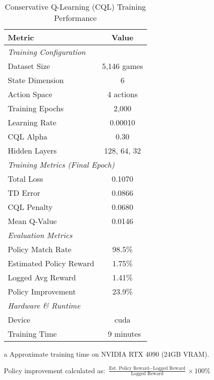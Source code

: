 \begin{table}[htbp]
\centering
\caption{Conservative Q-Learning (CQL) Training Performance}
\label{tab:cql_performance}
\begin{threeparttable}
\begin{tabular}{lc}
\toprule
\textbf{Metric}  & \textbf{Value} \\
\midrule
\multicolumn{2}{l}{\textit{Training Configuration}} \\
Dataset Size & 5,146 games \\
State Dimension & 6 \\
Action Space & 4 actions \\
Training Epochs & 2,000 \\
Learning Rate & 0.00010 \\
CQL Alpha & 0.30 \\
Hidden Layers & 128, 64, 32 \\
\midrule
\multicolumn{2}{l}{\textit{Training Metrics (Final Epoch)}} \\
Total Loss & 0.1070 \\
TD Error & 0.0866 \\
CQL Penalty & 0.0680 \\
Mean Q-Value & 0.0146 \\
\midrule
\multicolumn{2}{l}{\textit{Evaluation Metrics}} \\
Policy Match Rate & 98.5\% \\
Estimated Policy Reward & 1.75\% \\
Logged Avg Reward & 1.41\% \\
Policy Improvement & 23.9\% \\
\midrule
\multicolumn{2}{l}{\textit{Hardware \& Runtime}} \\
Device & cuda \\
Training Time & ~9 minutes\tnote{a} \\
\bottomrule
\end{tabular}
\begin{tablenotes}
\small
\item[a] Approximate training time on NVIDIA RTX 4090 (24GB VRAM).
\item Policy improvement calculated as: $\frac{\text{Est. Policy Reward} - \text{Logged Reward}}{\text{Logged Reward}} \times 100\%$
\end{tablenotes}
\end{threeparttable}
\end{table}
